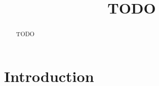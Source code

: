 \documentclass[sigconf]{acmart}
\begin{document}
	
	
	\title{TODO}
	
	
	\author{}
	\email{}
	\orcid{}
	\author{}
	\authornotemark[]
	\email{}
	\affiliation{%
		\institution{}
		\streetaddress{}
		\city{}
		\state{}
		\country{}
		\postcode{}
	}
	
	
	\begin{abstract}
		TODO
	\end{abstract}
	

	
	
	
	\maketitle
	
	\section{Introduction}
	
	
\end{document}
